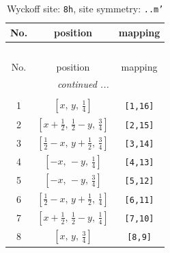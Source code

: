 \documentclass[fleqn,8pt]{jsarticle}
\begin{document}
\begin{longtable}{ccc}
\caption{Wyckoff site: {\tt 8h}, site symmetry: {\tt ..m'}}
 \\
 \hline \hline
No. & position & mapping \\ \hline \endfirsthead

\multicolumn{2}{l}{\tablename\ \thetable{}} \\
 \hline \hline
No. & position & mapping \\ \hline \endhead

 \hline \hline
\multicolumn{2}{r}{\footnotesize\it continued ...} \\ \endfoot

 \hline \hline
\multicolumn{2}{r}{} \\ \endlastfoot

1 & $\left[ x,\, y,\, \frac{1}{4} \right]$ & {\tt [1,16]} \\ \hline
2 & $\left[ x + \frac{1}{2},\, \frac{1}{2} - y,\, \frac{3}{4} \right]$ & {\tt [2,15]} \\ \hline
3 & $\left[ \frac{1}{2} - x,\, y + \frac{1}{2},\, \frac{3}{4} \right]$ & {\tt [3,14]} \\ \hline
4 & $\left[ - x,\, - y,\, \frac{1}{4} \right]$ & {\tt [4,13]} \\ \hline
5 & $\left[ - x,\, - y,\, \frac{3}{4} \right]$ & {\tt [5,12]} \\ \hline
6 & $\left[ \frac{1}{2} - x,\, y + \frac{1}{2},\, \frac{1}{4} \right]$ & {\tt [6,11]} \\ \hline
7 & $\left[ x + \frac{1}{2},\, \frac{1}{2} - y,\, \frac{1}{4} \right]$ & {\tt [7,10]} \\ \hline
8 & $\left[ x,\, y,\, \frac{3}{4} \right]$ & {\tt [8,9]} \\
\end{longtable}
\renewcommand{\arraystretch}{1.2}
\end{document}
